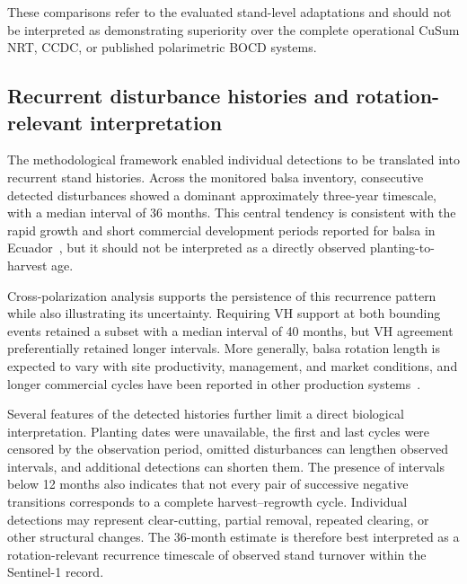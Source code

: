 These comparisons refer to the evaluated stand-level adaptations and should not be interpreted as demonstrating superiority over the complete operational CuSum NRT, CCDC, or published polarimetric BOCD systems.


\subsection{Recurrent disturbance histories and rotation-relevant interpretation}

The methodological framework enabled individual detections to be translated into recurrent stand histories. Across the monitored balsa inventory, consecutive detected disturbances showed a dominant approximately three-year timescale, with a median interval of 36 months. This central tendency is consistent with the rapid growth and short commercial development periods reported for balsa in Ecuador~\citep{GonzalezOsorio2010Balsa,CanadasLopez2019BalsaGrowth}, but it should not be interpreted as a directly observed planting-to-harvest age.

Cross-polarization analysis supports the persistence of this recurrence pattern while also illustrating its uncertainty. Requiring VH support at both bounding events retained a subset with a median interval of 40 months, but VH agreement preferentially retained longer intervals. More generally, balsa rotation length is expected to vary with site productivity, management, and market conditions, and longer commercial cycles have been reported in other production systems~\citep{Jenkin2019BalsaValueChain,Midgley2010Balsa}.

Several features of the detected histories further limit a direct biological interpretation. Planting dates were unavailable, the first and last cycles were censored by the observation period, omitted disturbances can lengthen observed intervals, and additional detections can shorten them. The presence of intervals below 12 months also indicates that not every pair of successive negative transitions corresponds to a complete harvest--regrowth cycle. Individual detections may represent clear-cutting, partial removal, repeated clearing, or other structural changes. The 36-month estimate is therefore best interpreted as a rotation-relevant recurrence timescale of observed stand turnover within the Sentinel-1 record.

